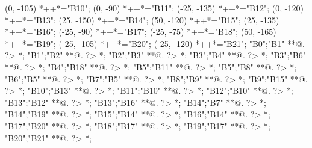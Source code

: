 \documentclass[landscape]{article}
\begin{document}
\begin{scriptsize}
(0, -105)
	*++{}*\frm{-,}="B10";
(0, -90)
	*++{}*\frm{-,}="B11";
(-25, -135)
	*++{}*\frm{-,}="B12";
(0, -120)
	*++{}*\frm{-,}="B13";
(25, -150)
	*++{}*\frm{-,}="B14";
(50, -120)
	*++{}*\frm{-,}="B15";
(25, -135)
	*++{}*\frm{-,}="B16";
(-25, -90)
	*++{}*\frm{-,}="B17";
(-25, -75)
	*++{}*\frm{-,}="B18";
(50, -165)
	*++{}*\frm{-,}="B19";
(-25, -105)
	*++{}*\frm{-,}="B20";
(-25, -120)
	*++{}*\frm{-,}="B21";
"B0";"B1" **@{.} ?> *{\dir{>}};
"B1";"B2" **@{.} ?> *{\dir{>}};
"B2";"B3" **@{.} ?> *{\dir{>}};
"B3";"B4" **@{.} ?> *{\dir{>}};
"B3";"B6" **@{.} ?> *{\dir{>}};
"B4";"B18" **@{.} ?> *{\dir{>}};
"B5";"B11" **@{.} ?> *{\dir{>}};
"B5";"B8" **@{.} ?> *{\dir{>}};
"B6";"B5" **@{.} ?> *{\dir{>}};
"B7";"B5" **@{.} ?> *{\dir{>}};
"B8";"B9" **@{.} ?> *{\dir{>}};
"B9";"B15" **@{.} ?> *{\dir{>}};
"B10";"B13" **@{.} ?> *{\dir{>}};
"B11";"B10" **@{.} ?> *{\dir{>}};
"B12";"B10" **@{.} ?> *{\dir{>}};
"B13";"B12" **@{.} ?> *{\dir{>}};
"B13";"B16" **@{.} ?> *{\dir{>}};
"B14";"B7" **@{.} ?> *{\dir{>}};
"B14";"B19" **@{.} ?> *{\dir{>}};
"B15";"B14" **@{.} ?> *{\dir{>}};
"B16";"B14" **@{.} ?> *{\dir{>}};
"B17";"B20" **@{.} ?> *{\dir{>}};
"B18";"B17" **@{.} ?> *{\dir{>}};
"B19";"B17" **@{.} ?> *{\dir{>}};
"B20";"B21" **@{.} ?> *{\dir{>}};
\endxy
\end{scriptsize}
\end{document}
